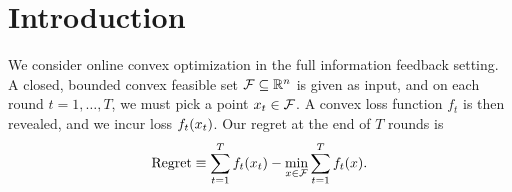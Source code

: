 \newcommand{\hQ}{\hat{Q}}
\newcommand{\hphi}{\hat{\phi}}
\newcommand{\Snp}{S^n_{+}}
\renewcommand{\Snpp}{S^n_{++}}


\newcommand{\Qfs}{\mathcal{Q}}

\newcommand{\constQ}{\Qfs_{\text{const}}}
\newcommand{\diagQ}{\Qfs_{\text{diag}}}
\newcommand{\fullQ}{\Qfs_{\text{full}}}

\newcommand{\FTPRL}{FTPRL\xspace}
\newcommand{\FTPRLdiag}{\mbox{FTPRL-Diag}\xspace}
\newcommand{\FTPRLscale}{\mbox{FTPRL-Scale}\xspace}
\newcommand{\E}[1]{\mathbb{E}\left[#1\right]}
\newcommand{\tp}{\top}

\def \oset {\paren}


\newcommand{\reviewer}[1]{\textbf{REVIEWER[}\emph{#1}\textbf{]}}

\newcommand{\shortlong}[2]{#2}   %






\maketitle

\begin{abstract}
We introduce a new online convex optimization algorithm that
adaptively chooses its regularization function based on the loss
functions observed so far.  This is in contrast to previous algorithms
that use a fixed regularization function such as $L_2$-squared, and
modify it only via a single time-dependent parameter.  Our algorithm's
regret bounds are worst-case optimal, and for certain realistic
classes of loss functions they are much better than existing bounds.
These bounds are problem-dependent, which means they can exploit the
structure of the actual problem instance.  Critically, however, our
algorithm does not need to know this structure in advance.  Rather, we
prove competitive guarantees that show the algorithm provides a bound
within a constant factor of the best possible bound (of a certain
functional form) in hindsight.
\end{abstract}




\section{Introduction}
We consider online convex optimization in the full information
feedback setting.  A closed, bounded convex feasible set $\mathcal{F}
\subseteq \mathbb{R}^n$ is given as input, and on each round $t=1, \dots,
T$, we must pick a point $x_t \in \mathcal{F}$.  A convex loss function $f_t$
is then revealed, and we incur loss $f_t(x_t)$.  Our regret at
the end of $T$ rounds is
\begin{equation}
\text{Regret} \equiv \sum_{t=1}^T f_t (x_t) - \min_{x \in \mathcal{F}} \sum_{t=1}^T f_t(x) .
\end{equation}

